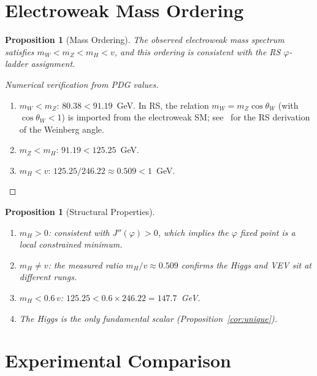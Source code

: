 \documentclass[12pt,a4paper]{article}
\newtheorem{proposition}[theorem]{Proposition}
\theoremstyle{definition}
\theoremstyle{remark}
\begin{document}
\section{Electroweak Mass Ordering}
\label{sec:ordering}

\begin{proposition}[Mass Ordering]
\label{thm:ordering}
The observed electroweak mass spectrum satisfies
$m_W < m_Z < m_H < v$, and this ordering is consistent
with the RS $\varphi$-ladder assignment.
\end{proposition}

\begin{proof}[Numerical verification from PDG values]
\begin{enumerate}[nosep]
  \item $m_W < m_Z$: $80.38 < 91.19$~GeV.
  In RS, the relation $m_W = m_Z \cos\theta_W$ (with
  $\cos\theta_W < 1$) is imported from the electroweak SM;
  see~\cite{RS_Axioms} for the RS derivation of the Weinberg angle.
  \item $m_Z < m_H$: $91.19 < 125.25$~GeV.
  \item $m_H < v$: $125.25 / 246.22 \approx 0.509 < 1$~GeV.
\end{enumerate}
\end{proof}

\begin{proposition}[Structural Properties]
\label{thm:properties}
\begin{enumerate}[label=(\roman*), nosep]
  \item $m_H > 0$: consistent with $J''(\varphi) > 0$,
  which implies the $\varphi$ fixed point is a local
  constrained minimum.
  \item $m_H \neq v$: the measured ratio $m_H/v \approx 0.509$
  confirms the Higgs and VEV sit at different rungs.
  \item $m_H < 0.6\,v$: $125.25 < 0.6 \times 246.22 = 147.7$~GeV.
  \item The Higgs is the only fundamental scalar
  (Proposition~\ref{cor:unique}).
\end{enumerate}
\end{proposition}

\section{Experimental Comparison}
\label{sec:comparison}
\end{document}
